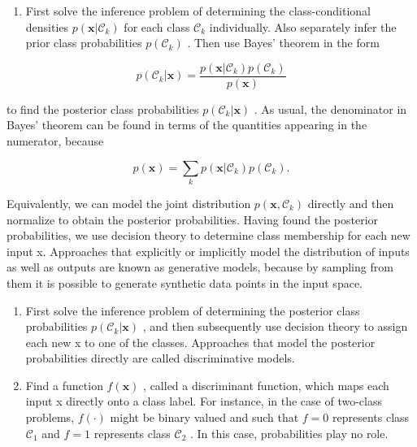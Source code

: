 \documentclass[
  10
]{article}
\providecommand{\tightlist}{%
  \setlength{\itemsep}{0pt}\setlength{\parskip}{0pt}}
\begin{document}
\begin{enumerate}
\def\labelenumi{(\alph{enumi})}
\tightlist
\item
  First solve the inference problem of determining the class-conditional
  densities \(p ( \mathbf { x } | \mathcal { C } _ { k } )\) for each
  class \(\mathcal { C } _ { k }\) individually. Also separately infer
  the prior class probabilities \(p ( \mathcal { C } _ { k } )\) . Then
  use Bayes' theorem in the form
\end{enumerate}

\[
p (\mathcal {C} _ {k} | \mathbf {x}) = \frac {p (\mathbf {x} | \mathcal {C} _ {k}) p (\mathcal {C} _ {k})}{p (\mathbf {x})}\tag{1.82}
\]

to find the posterior class probabilities
\(p ( \mathcal { C } _ { k } \vert \mathbf { x } )\) . As usual, the
denominator in Bayes' theorem can be found in terms of the quantities
appearing in the numerator, because

\[
p (\mathbf {x}) = \sum_ {k} p (\mathbf {x} | \mathcal {C} _ {k}) p (\mathcal {C} _ {k}).\tag{1.83}
\]

Equivalently, we can model the joint distribution
\(p ( \mathbf { x } , \mathcal { C } _ { k } )\) directly and then
normalize to obtain the posterior probabilities. Having found the
posterior probabilities, we use decision theory to determine class
membership for each new input x. Approaches that explicitly or
implicitly model the distribution of inputs as well as outputs are known
as generative models, because by sampling from them it is possible to
generate synthetic data points in the input space.

\begin{enumerate}
\def\labelenumi{(\alph{enumi})}
\setcounter{enumi}{1}
\item
  First solve the inference problem of determining the posterior class
  probabilities \(p ( \mathcal { C } _ { k } | \mathbf { x } )\) , and
  then subsequently use decision theory to assign each new x to one of
  the classes. Approaches that model the posterior probabilities
  directly are called discriminative models.
\item
  Find a function \(f ( \mathbf { x } )\) , called a discriminant
  function, which maps each input x directly onto a class label. For
  instance, in the case of two-class problems, \(f ( \cdot )\) might be
  binary valued and such that \(f = 0\) represents class
  \(\mathcal { C } _ { 1 }\) and \(f = 1\) represents class
  \(\mathcal { C } _ { 2 }\) . In this case, probabilities play no role.
\end{enumerate}
\end{document}
